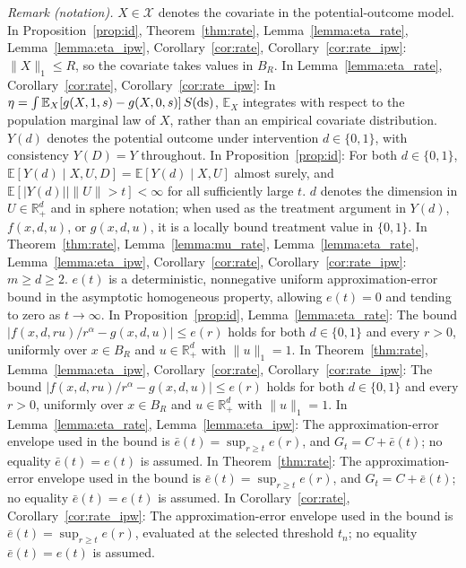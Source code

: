 \documentclass[12pt]{article}
\theoremstyle{plain}
\theoremstyle{definition}
\begin{document}
\noindent\textit{Remark (notation).} $X\in\mathcal{X}$ denotes the covariate in the potential-outcome model. In Proposition~\ref{prop:id}, Theorem~\ref{thm:rate}, Lemma~\ref{lemma:eta_rate}, Lemma~\ref{lemma:eta_ipw}, Corollary~\ref{cor:rate}, Corollary~\ref{cor:rate_ipw}: $\|X\|_1\leqslant R$, so the covariate takes values in $B_R$. In Lemma~\ref{lemma:eta_rate}, Corollary~\ref{cor:rate}, Corollary~\ref{cor:rate_ipw}: In $\eta=\int\mathbb E_X[g(X,1,s)-g(X,0,s)]\,S(\operatorname{ds})$, $\mathbb E_X$ integrates with respect to the population marginal law of $X$, rather than an empirical covariate distribution. $Y(d)$ denotes the potential outcome under intervention $d\in\{0,1\}$, with consistency $Y(D)=Y$ throughout. In Proposition~\ref{prop:id}: For both $d\in\{0,1\}$, $\mathbb E[Y(d)\mid X,U,D]=\mathbb E[Y(d)\mid X,U]$ almost surely, and $\mathbb E[|Y(d)|\mid\|U\|>t]<\infty$ for all sufficiently large $t$. $d$ denotes the dimension in $U\in\mathbb R_+^d$ and in sphere notation; when used as the treatment argument in $Y(d)$, $f(x,d,u)$, or $g(x,d,u)$, it is a locally bound treatment value in $\{0,1\}$. In Theorem~\ref{thm:rate}, Lemma~\ref{lemma:mu_rate}, Lemma~\ref{lemma:eta_rate}, Lemma~\ref{lemma:eta_ipw}, Corollary~\ref{cor:rate}, Corollary~\ref{cor:rate_ipw}: $m\geq d\geq2$. $e(t)$ is a deterministic, nonnegative uniform approximation-error bound in the asymptotic homogeneous property, allowing $e(t)=0$ and tending to zero as $t\rightarrow\infty$. In Proposition~\ref{prop:id}, Lemma~\ref{lemma:eta_rate}: The bound $|f(x,d,ru)/r^\alpha-g(x,d,u)|\leq e(r)$ holds for both $d\in\{0,1\}$ and every $r>0$, uniformly over $x\in B_R$ and $u\in\mathbb R_+^d$ with $\|u\|_1=1$. In Theorem~\ref{thm:rate}, Lemma~\ref{lemma:eta_ipw}, Corollary~\ref{cor:rate}, Corollary~\ref{cor:rate_ipw}: The bound $|f(x,d,ru)/r^\alpha-g(x,d,u)|\leq e(r)$ holds for both $d\in\{0,1\}$ and every $r>0$, uniformly over $x\in B_R$ and $u\in\mathbb R_+^d$ with $\|u\|_1=1$. In Lemma~\ref{lemma:eta_rate}, Lemma~\ref{lemma:eta_ipw}: The approximation-error envelope used in the bound is $\bar e(t)=\sup_{r\geq t}e(r)$, and $G_t=C+\bar e(t)$; no equality $\bar e(t)=e(t)$ is assumed. In Theorem~\ref{thm:rate}: The approximation-error envelope used in the bound is $\bar e(t)=\sup_{r\geq t}e(r)$, and $G_t=C+\bar e(t)$; no equality $\bar e(t)=e(t)$ is assumed. In Corollary~\ref{cor:rate}, Corollary~\ref{cor:rate_ipw}: The approximation-error envelope used in the bound is $\bar e(t)=\sup_{r\geq t}e(r)$, evaluated at the selected threshold $t_n$; no equality $\bar e(t)=e(t)$ is assumed.
\end{document}
